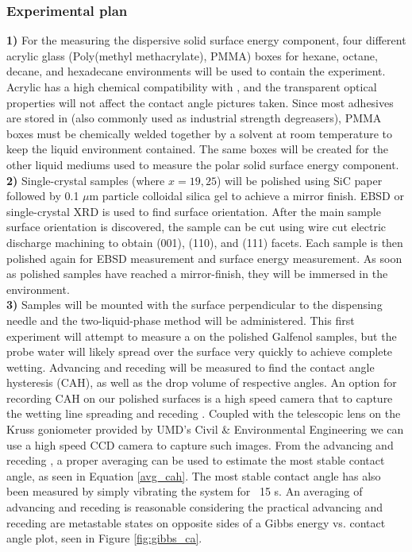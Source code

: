 \subsubsection{Experimental plan}
\textbf{1)} For the measuring the dispersive solid surface energy component, four different acrylic glass (Poly(methyl methacrylate), PMMA) boxes for hexane, octane, decane, and hexadecane environments will be used to contain the experiment. Acrylic has a high chemical compatibility with \nalk[s], and the transparent optical properties will not affect the contact angle pictures taken.\cite{Thermoscientific} Since most adhesives are stored in \nalk[s] (also commonly used as industrial strength degreasers), PMMA boxes must be chemically welded together by a solvent at room temperature to keep the liquid environment contained. The same boxes will be created for the other liquid mediums used to measure the polar solid surface energy component. \\
\textbf{2)} Single-crystal samples (\fegacomp where $x=19,25$) will be polished using SiC paper followed by 0.1 $\mu$m particle colloidal silica gel to achieve a mirror finish. EBSD or single-crystal XRD is used to find surface orientation. After the main sample surface orientation is discovered, the sample can be cut using wire cut electric discharge machining to obtain \hkl(001), \hkl(110), and \hkl(111) facets. Each sample is then polished again for EBSD measurement and surface energy measurement. As soon as polished samples have reached a mirror-finish, they will be immersed in the \nalk environment. \\ 
\textbf{3)} Samples will be mounted with the surface perpendicular to the dispensing needle and the two-liquid-phase method will be administered. This first experiment will attempt to measure a \ca on the polished Galfenol samples, but the probe water will likely spread over the surface very quickly to achieve complete wetting. Advancing and receding \ca[s] will be measured to find the contact angle hysteresis (CAH), as well as the drop volume of respective angles. An option for recording CAH on our polished surfaces is a high speed camera that to capture the wetting line spreading and receding . Coupled with the telescopic lens on the Kruss goniometer provided by UMD's Civil \& Environmental Engineering we can use a high speed CCD camera to capture such images. From the advancing and receding \ca[s], a proper averaging can be used to estimate the most stable contact angle, as seen in Equation \ref{avg_cah}.\cite{Andrieu1994} The most stable contact angle has also been measured by simply vibrating the system for ~15 s.\cite{Meiron2004} An averaging of advancing and receding \ca[s] is reasonable considering the practical advancing and receding \ca[s] are metastable states on opposite sides of a Gibbs energy vs. contact angle plot, seen in Figure \ref{fig:gibbs_ca}.

